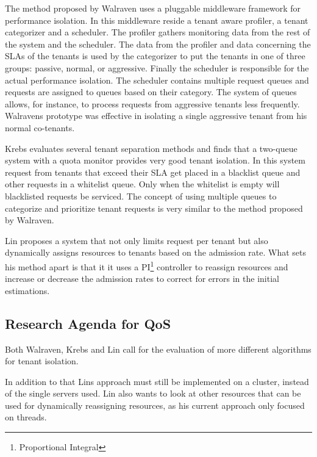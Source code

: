 The method proposed by Walraven uses a pluggable middleware framework for performance isolation.
In this middleware reside a tenant aware profiler, a tenant categorizer and a scheduler. 
The profiler gathers monitoring data from the rest of the system and the scheduler.
The data from the profiler and data concerning the SLAs of the tenants is used by the categorizer to put the tenants in one of three groups: passive, normal, or aggressive.
Finally the scheduler is responsible for the actual performance isolation.
The scheduler contains multiple request queues and requests are assigned to queues based on their category.
The system of queues allows, for instance, to process requests from aggressive tenants less frequently.
Walravens prototype was effective in isolating a single aggressive tenant from his normal co-tenants.

Krebs evaluates several tenant separation methods and finds that a two-queue system with a quota monitor provides very good tenant isolation.
In this system request from tenants that exceed their SLA get placed in a blacklist queue and other requests in a whitelist queue. 
Only when the whitelist is empty will blacklisted requests be serviced.
The concept of using multiple queues to categorize and prioritize tenant requests is very similar to the method proposed by Walraven.

Lin proposes a system that not only limits request per tenant but also dynamically assigns resources to tenants based on the admission rate.
What sets his method apart is that it it uses a PI\footnote{Proportional Integral} controller to reassign resources and increase or decrease the admission rates to correct for errors in the initial estimations.

\subsection{Research Agenda for QoS}
Both Walraven, Krebs and Lin call for the evaluation of more different algorithms for tenant isolation.

In addition to that Lins approach must still be implemented on a cluster, instead of the single servers used. Lin also wants to look at other resources that can be used for dynamically reassigning resources, as his current approach only focused on threads.
